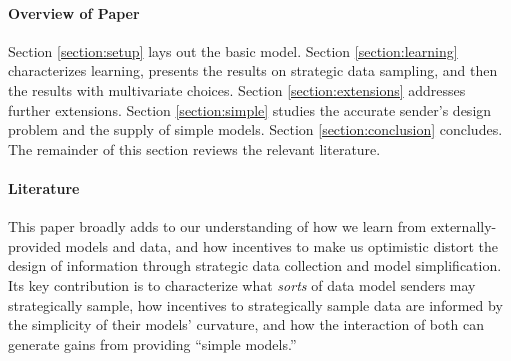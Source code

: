 \documentclass[11pt,dvipsnames]{article}
\begin{document}
%
%

\paragraph{Overview of Paper} Section \ref{section:setup} lays out the basic model.
Section \ref{section:learning} characterizes learning, presents the results on strategic data sampling, and then the results with multivariate choices.
Section \ref{section:extensions} addresses further extensions.
Section \ref{section:simple} studies the accurate sender's design problem and the supply of simple models.
Section \ref{section:conclusion} concludes.
The remainder of this section reviews the relevant literature.

\paragraph{Literature}\label{section:literature}
This paper broadly adds to our understanding of how we learn from externally-provided models and data, and how incentives to make us optimistic distort the design of information through strategic data collection and model simplification.
Its key contribution is to characterize what \emph{sorts} of data model senders may strategically sample, how incentives to strategically sample data are informed by the simplicity of their models' curvature, and how the interaction of both can generate gains from providing ``simple models.'' 
\end{document}

